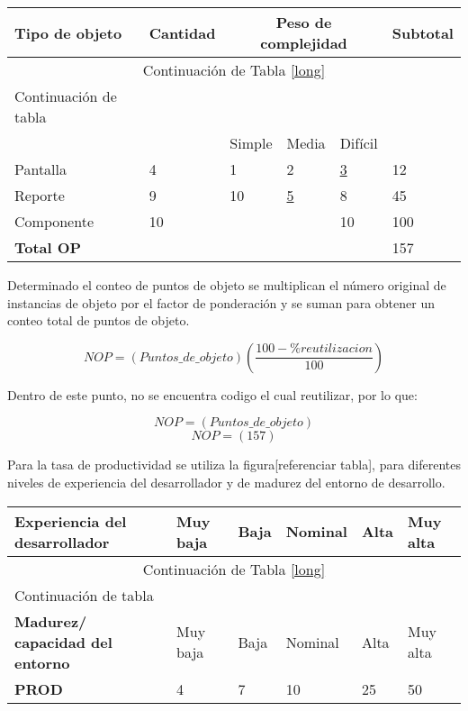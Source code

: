 \begin{longtable}{  l | l | l | l | l | l  }	
	
	\hline
	
	\textbf{Tipo de objeto } & \textbf{Cantidad } & \multicolumn{3}{|c|}{\textbf{Peso de complejidad}} & \textbf{Subtotal }  \\
	
	\endfirsthead
	
	\multicolumn{6}{c}{Continuación de Tabla \ref{long}}\\
	\hline
	Continuación de tabla\\
	\hline
	\endhead
	
	\hline
	\endfoot
	
	& & Simple & Media & Difícil &  \\
	\hline
	\hline
	Pantalla & 4 & 1 & 2 & \underline{3} & 12 \\
	Reporte & 9 & 10 & \underline{5} & 8 & 45 \\
	Componente & 10 &  &  & 10 & 100 \\
	\hline
	\multicolumn{5}{l|}{\textbf{Total OP}}&  157 \\	
\end{longtable}

Determinado el conteo de puntos de objeto se multiplican el número original de instancias de objeto por el factor de ponderación y se suman para obtener un conteo total de puntos de objeto.

\[ NOP = (Puntos\_de\_objeto)(\frac{100-\%reutilizacion}{100})\]

Dentro de este punto, no se encuentra codigo el cual reutilizar, por lo que:

\[ NOP = (Puntos\_de\_objeto)\]
\[ NOP = (157)\]

Para la tasa de productividad se utiliza la figura[referenciar tabla], para diferentes niveles de experiencia del desarrollador y de madurez del entorno de desarrollo.



\begin{longtable}{  l || l | l | l | l | l  }	
	
	\hline
	
	\textbf{Experiencia del desarrollador } & Muy baja & Baja & Nominal & Alta & Muy alta  \\
	\hline
	
	\endfirsthead
	
	\multicolumn{6}{c}{Continuación de Tabla \ref{long}}\\
	\hline
	Continuación de tabla\\
	\hline
	\endhead
	
	\hline
	\endfoot
	
	\textbf{Madurez/ capacidad del entorno } & Muy baja & Baja & Nominal & Alta & Muy alta  \\
	\hline
	\textbf{PROD } & 4 & 7 & 10 & 25 & 50 \\
\end{longtable}

